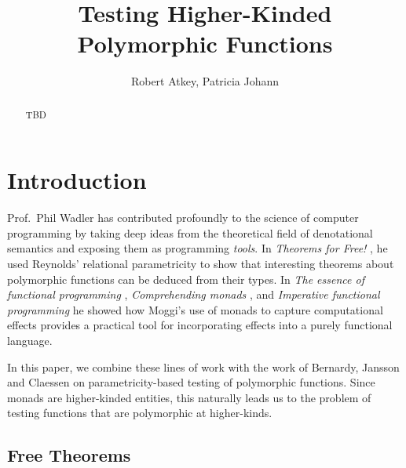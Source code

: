 \documentclass{llncs}
\title{Testing Higher-Kinded Polymorphic Functions}
\author{Robert Atkey\inst{1}, Patricia Johann\inst{2}}
\institute{Computer and Information Sciences,
University of Strathclyde
\and
Computer Science Department,
Appalachian State University
}
\begin{document}
\maketitle

\begin{abstract}
  TBD
\end{abstract}

\section{Introduction}

Prof.~Phil Wadler has contributed profoundly to the science of
computer programming by taking deep ideas from the theoretical field
of denotational semantics and exposing them as programming
\emph{tools}. In \emph{Theorems for Free!}
\cite{DBLP:conf/fpca/Wadler89}, he used Reynolds' relational
parametricity to show that interesting theorems about polymorphic
functions can be deduced from their types. In \emph{The essence of
  functional programming} \cite{DBLP:conf/popl/Wadler92},
\emph{Comprehending monads} \cite{DBLP:journals/mscs/Wadler92}, and
\emph{Imperative functional programming}
\cite{DBLP:conf/popl/JonesW93} he showed how Moggi's use of monads to
capture computational effects provides a practical tool for
incorporating effects into a purely functional language.

In this paper, we combine these lines of work with the work of
Bernardy, Jansson and Claessen \cite{DBLP:conf/esop/BernardyJC10} on
parametricity-based testing of polymorphic functions. Since monads are
higher-kinded entities, this naturally leads us to the problem of
testing functions that are polymorphic at higher-kinds.

\subsection{Free Theorems}
\end{document}
